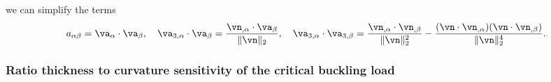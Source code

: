 we can simplify the terms
 \begin{align}\label{eq:va_identity}
      a_{\alpha\beta}  = \va_\alpha \cdot \va_\beta,\quad \va_{3,\alpha} \cdot \va_{\beta}   = \frac{\vn_{,\alpha} \cdot \va_\beta }{ \| \vn \|_2 },\quad
      \va_{3,\alpha} \cdot \va_{3,\beta}
      =\frac{\vn_{,\alpha} \cdot \vn_{,\beta}  }{ \| \vn \|_2^2 } - \frac{ (\vn \cdot\vn_{,\alpha})  (\vn \cdot \vn_{,\beta} ) }{ \| \vn \|_2^4}.
 \end{align}

 \subsubsection{Ratio thickness to curvature sensitivity of the critical buckling load}


    


